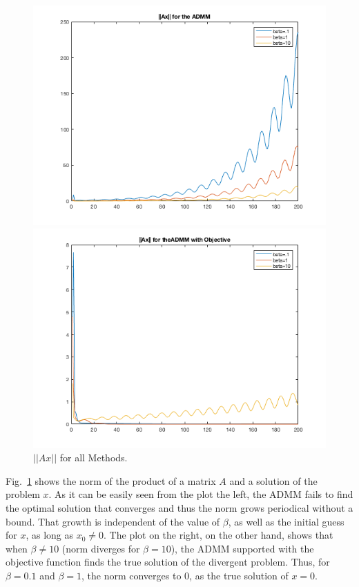 \documentclass[answers]{exam}
\begin{document}
\begin{itemize}
\begin{framed}
\begin{figure}[H]
    \centering
    \caption{$||Ax||$ for all Methods.}
    \begin{minipage}{.5\textwidth}
        \centering
        \includegraphics[width=1.1\textwidth, height=0.3\textheight]{Problem7_3a.png}
    \end{minipage}%
    \begin{minipage}{0.5\textwidth}
        \centering
        \includegraphics[width=1.1\textwidth, height=0.3\textheight]{Problem7_4a.png}
    \end{minipage}
    \label{normADMM}
\end{figure}
Fig.~\ref{normADMM} shows the norm of the product of a matrix $A$  and a solution of the problem $x$. As it can be easily seen from the plot the left, the ADMM fails to find the optimal solution that converges and thus the norm grows periodical without a bound. That growth is independent of the value of $\beta$, as well as the initial guess for $x$, as long as $x_0\not=0$. The plot on the right, on the other hand, shows that when $\beta\not=10$ (norm diverges for $\beta=10$), the ADMM supported with the objective function finds the true solution of the divergent problem. Thus, for $\beta=0.1$ and $\beta=1$, the norm converges to 0, as the true solution of $x=0$. 

\end{framed}
\end{itemize}
\end{document}
